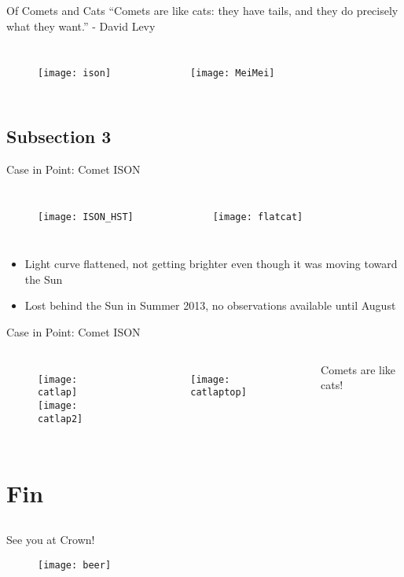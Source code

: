 \documentclass{beamer}
\begin{document}
\begin{frame}[label=cometsarecats]{Of Comets and Cats}
``Comets are like cats: they have tails, and they do precisely what they want.'' - David Levy 
\begin{columns}
 \begin{figure}
 \texttt{[image: ison]}
 \end{figure}
 \begin{figure}
  \texttt{[image: MeiMei]}
 \end{figure}
 \end{columns}
\end{frame}
 
\subsection{Subsection 3}
\begin{frame}{Case in Point: Comet ISON}
\begin{columns}
\begin{figure}
 \texttt{[image: ISON\_HST]}
\end{figure}
\begin{figure}
 \texttt{[image: flatcat]}
\end{figure}
\end{columns}
\begin{itemize}
 \item Light curve flattened, not getting brighter even though it was moving toward the Sun
 \item Lost behind the Sun in Summer 2013, no observations available until August
\end{itemize}
 \end{frame}

\begin{frame}{Case in Point: Comet ISON}
\begin{columns}
\begin{figure}
 \texttt{[image: catlap]}\\
 \texttt{[image: catlap2]}
\end{figure}
\begin{figure}
 \texttt{[image: catlaptop]}
\end{figure}
Comets are like cats!\hyperlink{cometsarecats}{\beamergotobutton{}}
\end{columns}
\end{frame}

\section{Fin}
\subsection{}
\begin{frame}
\begin{center}
See you at Crown!
\end{center}
\begin{figure}
 \texttt{[image: beer]}
\end{figure}
\end{frame}
\end{document}
